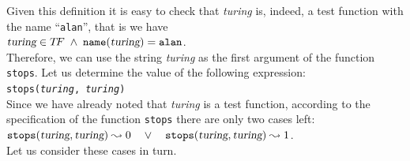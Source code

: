 Given this definition it is easy to check that \textsl{turing} is, indeed, a test function with the name
``\texttt{alan}'', that is we have 
\\[0.3cm]
\hspace*{1.3cm} 
$\textsl{turing} \in T\!F \;\wedge\; \mathtt{name}(\textsl{turing}) = \mathtt{alan}$. 
\\[0.2cm]
Therefore, we can use the string \textsl{turing} as the first argument of the function
\texttt{stops}.
Let us determine the value of the following expression:
\\[0.2cm]
\hspace*{1.3cm} 
\texttt{stops(\textsl{turing}, \textsl{turing})} 
\\[0.2cm]
Since we have already noted that \textsl{turing} is a test function, according to the specification of
the function \texttt{stops} there are only two cases left:
\\[0.2cm]
\hspace*{1.3cm} 
$\mathtt{stops}(\textsl{turing}, \textsl{turing}) \leadsto 0 \quad \vee\quad
 \mathtt{stops}(\textsl{turing}, \textsl{turing}) \leadsto 1$.
\\[0.2cm]
Let us consider these cases in turn.
